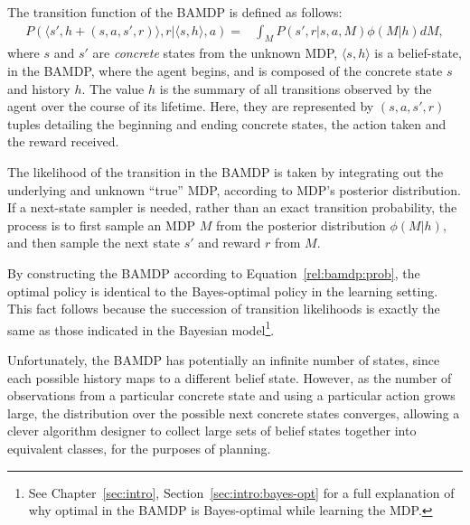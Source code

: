 The transition function of the BAMDP is defined as follows:
\begin{eqnarray}
\label{rel:bamdp:prob}
P(\langle s', h + (s,a,s',r)\rangle, r | \langle s, h\rangle, a) =& \int_M P(s', r | s, a, M)\phi(M|h) dM,
\end{eqnarray}
where $s$ and $s'$ are \emph{concrete} states from the unknown MDP, $\langle s, h\rangle$ is a belief-state, in the BAMDP, where the agent begins, and is composed of the concrete state $s$ and history $h$. The value $h$ is the summary of all transitions observed by the agent over the course of its lifetime. Here, they are represented by $(s, a, s',r)$ tuples detailing the beginning and ending concrete states, the action taken and the reward received.

The likelihood of the transition in the BAMDP is taken by integrating out the underlying and unknown ``true'' MDP, according to MDP's posterior distribution. If a next-state sampler is needed, rather than an exact transition probability, the process is to first sample an MDP $M$ from the posterior distribution $\phi(M|h)$, and then sample the next state $s'$ and reward $r$ from $M$.

By constructing the BAMDP according to Equation~\ref{rel:bamdp:prob}, the optimal policy is identical to the Bayes-optimal policy in the learning setting. This fact follows because the succession of transition likelihoods is exactly the same as those indicated in the Bayesian model\footnote{See Chapter~\ref{sec:intro}, Section~\ref{sec:intro:bayes-opt} for a full explanation of why optimal in the BAMDP is Bayes-optimal while learning the MDP.}. 

Unfortunately, the BAMDP has potentially an infinite number of states, since each possible history maps to a different belief state. However, as the number of observations from a particular concrete state and using a particular action grows large, the distribution over the possible next concrete states converges, allowing a clever algorithm designer to collect large sets of belief states together into equivalent classes, for the purposes of planning.  



